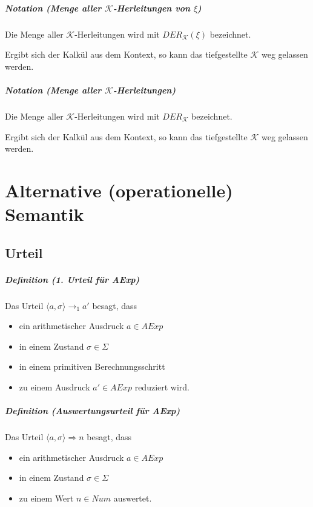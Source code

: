 \documentclass[a4paper, 11pt, accentcolor = tud3b]{tudreport}
\newcommand{\definition}[2]{\subparagraph{Definition (#1)} #2}
\newcommand{\notation}[2]{\subparagraph{Notation (#1)} #2}
\begin{document}
				    \notation{Menge aller $ \mathcal{K} $-Herleitungen von $ \xi $}{
					    Die Menge aller $ \mathcal{K} $-Herleitungen wird mit $ \textit{DER} _ \mathcal{K} (\xi) $ bezeichnet.
					    
					    Ergibt sich der Kalkül aus dem Kontext, so kann das tiefgestellte $ \mathcal{K} $ weg gelassen werden.
				    }
				    
				    \notation{Menge aller $ \mathcal{K} $-Herleitungen}{
					    Die Menge aller $ \mathcal{K} $-Herleitungen wird mit $ \textit{DER} _ \mathcal{K} $ bezeichnet.
				    	
				    	Ergibt sich der Kalkül aus dem Kontext, so kann das tiefgestellte $ \mathcal{K} $ weg gelassen werden.
				    }
	    
	    \section{Alternative (operationelle) Semantik}
		    \subsection{Urteil}
			    \definition{1. Urteil für \textit{AExp}}{
			    	Das Urteil $ \langle a, \sigma \rangle \rightarrow _ 1 a' $ besagt, dass
			    	\begin{itemize}
			    		\item ein arithmetischer Ausdruck $ a \in \textit{AExp} $
			    		\item in einem Zustand $ \sigma \in \Sigma $
			    		\item in einem primitiven Berechnungsschritt
			    		\item zu einem Ausdruck $ a' \in \textit{AExp} $ reduziert wird.
			    	\end{itemize}
			    }
			    
			    \definition{Auswertungsurteil für \textit{AExp}}{
			    	Das Urteil $ \langle a, \sigma \rangle \Rightarrow n $ besagt, dass
			    	\begin{itemize}
			    		\item ein arithmetischer Ausdruck $ a \in \textit{AExp} $
			    		\item in einem Zustand $ \sigma \in \Sigma $
			    		\item zu einem Wert $ n \in \textit{Num} $ auswertet.
			    	\end{itemize}
			    }
			    
\end{document}
